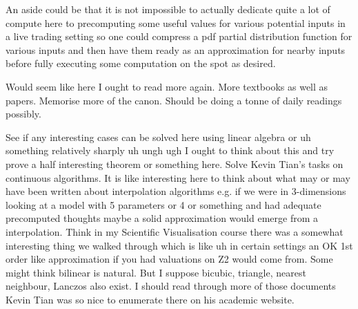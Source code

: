 An aside could be that it is not impossible to actually dedicate quite a lot of compute here to precomputing some useful values for various potential inputs in a live trading setting so one could compress a pdf partial distribution function for various inputs and then have them ready as an approximation for nearby inputs before fully executing some computation on the spot as desired.

Would seem like here I ought to read more again. More textbooks as well as papers. Memorise more of the canon. Should be doing a tonne of daily readings possibly.

See if any interesting cases can be solved here using linear algebra or uh something relatively sharply uh ungh ugh I ought to think about this and try prove a half interesting theorem or something here. Solve Kevin Tian's tasks on continuous algorithms. It is like interesting here to think about what may or may have been written about interpolation algorithms e.g. if we were in 3-dimensions looking at a model with 5 parameters or 4 or something and had adequate precomputed thoughts maybe a solid approximation would emerge from a interpolation. Think in my Scientific Visualisation course there was a somewhat interesting thing we walked through which is like uh in certain settings an OK 1st order like approximation if you had valuations on Z2 would come from. Some might think bilinear is natural. But I suppose bicubic, triangle, nearest neighbour, Lanczos also exist. I should read through more of those documents Kevin Tian was so nice to enumerate there on his academic website.

